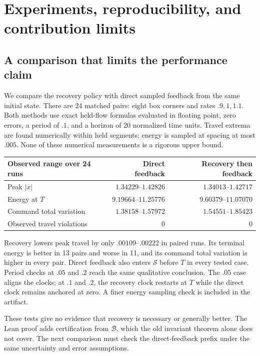 \documentclass[10pt]{article}
\begin{document}
\section{Experiments, reproducibility, and contribution limits}
\subsection{A comparison that limits the performance claim}
We compare the recovery policy with direct sampled feedback from the same initial state. There are 24 matched pairs: eight box corners and rates $.9,1,1.1$. Both methods use exact held-flow formulas evaluated in floating point, zero errors, a period of $.1$, and a horizon of 20 normalized time units. Travel extrema are found numerically within held segments; energy is sampled at spacing at most $.005$. None of these numerical measurements is a rigorous upper bound.

\begin{center}\small
\begin{tabular}{@{}lrr@{}}
\toprule
Observed range over 24 runs & Direct feedback & Recovery then feedback\\\midrule
Peak $|x|$ & $1.34229$--$1.42826$ & $1.34013$--$1.42717$\\
Energy at $T$ & $9.19664$--$11.25776$ & $9.60379$--$11.07070$\\
Command total variation & $1.38158$--$1.57972$ & $1.54551$--$1.85423$\\
Observed travel violations & 0 & 0\\\bottomrule
\end{tabular}
\end{center}
Recovery lowers peak travel by only $.00109$--$.00222$ in paired runs. Its terminal energy is better in 13 pairs and worse in 11, and its command total variation is higher in every pair. Direct feedback also enters $\mathcal S$ before $T$ in every tested case. Period checks at $.05$ and $.2$ reach the same qualitative conclusion. The $.05$ case aligns the clocks; at $.1$ and $.2$, the recovery clock restarts at $T$ while the direct clock remains anchored at zero. A finer energy sampling check is included in the artifact.

These tests give no evidence that recovery is necessary or generally better. The Lean proof adds certification from $\mathcal B$, which the old invariant theorem alone does not cover. The next comparison must check the direct-feedback prefix under the same uncertainty and error assumptions.
\end{document}
